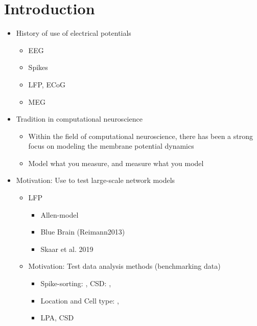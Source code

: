\documentclass[preprint,11pt,authoryear]{elsarticle}
\begin{document}
\tableofcontents

\linenumbers

\section{Introduction}
\label{sec:introduction}

\begin{itemize}
%
\item History of use of electrical potentials 
\begin{itemize}
\item EEG
\item Spikes
\item LFP, ECoG
\item MEG
\end{itemize}
%
\item Tradition in computational neuroscience
\begin{itemize} 
\item Within the field of computational neuroscience, there has been a strong focus on modeling the membrane potential dynamics 
\item Model what you measure, and measure what you model \citep{Einevoll2019}
\end{itemize}
\item Motivation: Use to test large-scale network models
\begin{itemize}
\item LFP
\begin{itemize}
\item Allen-model
\item Blue Brain (Reimann2013)
\item Skaar et al. 2019
\end{itemize}
%
\item Motivation: Test data analysis methods  (benchmarking data)
\begin{itemize}
\item Spike-sorting: \cite{Hagen2016, Buccino2019}, CSD: \cite{Pettersen2006, Potworowski2012, Ness2015}, 
\item Location and Cell type: \citep{DelgadoRuz2014, Buccino2018}, 
\item LPA, CSD 
\end{itemize}
%
\end{itemize}


\end{itemize}
\end{document}
